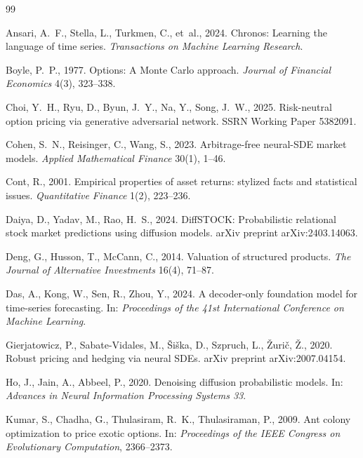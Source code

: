 \documentclass[12pt,letterpaper]{article}
\begin{document}
\clearpage
\begin{thebibliography}{99}
\singlespacing

Ansari, A.~F., Stella, L., Turkmen, C., et~al., 2024. Chronos: Learning the
language of time series. \emph{Transactions on Machine Learning Research}.

Boyle, P.~P., 1977. Options: A Monte Carlo approach. \emph{Journal of
Financial Economics} 4(3), 323--338.

Choi, Y.~H., Ryu, D., Byun, J.~Y., Na, Y., Song, J.~W., 2025. Risk-neutral
option pricing via generative adversarial network. SSRN Working Paper
5382091.

Cohen, S.~N., Reisinger, C., Wang, S., 2023. Arbitrage-free neural-SDE
market models. \emph{Applied Mathematical Finance} 30(1), 1--46.

Cont, R., 2001. Empirical properties of asset returns: stylized facts and
statistical issues. \emph{Quantitative Finance} 1(2), 223--236.

Daiya, D., Yadav, M., Rao, H.~S., 2024. DiffSTOCK: Probabilistic relational
stock market predictions using diffusion models. arXiv preprint
arXiv:2403.14063.

Deng, G., Husson, T., McCann, C., 2014. Valuation of structured products.
\emph{The Journal of Alternative Investments} 16(4), 71--87.

Das, A., Kong, W., Sen, R., Zhou, Y., 2024. A decoder-only foundation model
for time-series forecasting. In: \emph{Proceedings of the 41st International
Conference on Machine Learning}.

Gierjatowicz, P., Sabate-Vidales, M., \v{S}i\v{s}ka, D., Szpruch, L.,
\v{Z}uri\v{c}, \v{Z}., 2020. Robust pricing and hedging via neural SDEs.
arXiv preprint arXiv:2007.04154.

Ho, J., Jain, A., Abbeel, P., 2020. Denoising diffusion probabilistic
models. In: \emph{Advances in Neural Information Processing Systems 33}.

Kumar, S., Chadha, G., Thulasiram, R.~K., Thulasiraman, P., 2009. Ant colony
optimization to price exotic options. In: \emph{Proceedings of the IEEE
Congress on Evolutionary Computation}, 2366--2373.


\end{thebibliography}
\end{document}
